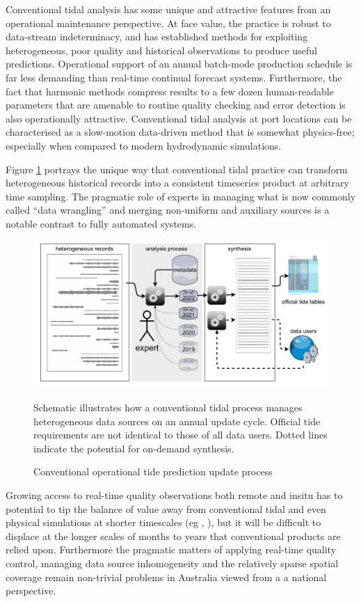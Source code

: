 Conventional tidal analysis has some unique and attractive features from an operational maintenance perspective.
At face value, the practice is robust to data-stream indeterminacy,  and has established methods for exploiting heterogeneous, poor quality and historical observations to produce useful predictions.  
Operational support of an annual batch-mode production schedule is far less demanding than real-time continual forecast systems. 
Furthermore, the fact that harmonic methods compress results to a few dozen human-readable parameters that are amenable to routine quality checking and error detection is also operationally attractive. 
Conventional tidal analysis at port locations can be characterised as a slow-motion data-driven method that is somewhat physics-free; especially when compared to modern hydrodynamic simulations. 

Figure \ref{fig:tidePractice} portrays the unique way that conventional tidal practice can transform heterogeneous historical records into a consistent timeseries product at arbitrary time sampling.
The pragmatic role of experts in managing what is now commonly  called ``data wrangling'' and merging non-uniform and auxiliary sources is a notable contrast to fully automated systems.
 
\begin{figure}[!hbt] \centering
        \includegraphics[width=\figwidthFull]{figures/diagrams/tideSchematic.pdf} 
        \caption{Conventional operational tide prediction update process}
        {Schematic illustrates how a conventional tidal process manages heterogeneous data sources on an annual update cycle.  Official tide requirements are not identical to those of all data users.  Dotted lines indicate the potential for on-demand synthesis.}
        \label{fig:tidePractice}
\end{figure}   


Growing access to real-time quality observations both remote and insitu has to potential to tip the balance of value away from conventional tidal and even physical simulations at shorter timescales (eg \citep{10.3389/fmars.2019.00437}, \citep{10.3389/fmars.2020.00260} ), but it will be difficult to displace at the longer scales of months to years that conventional products are relied upon.
Furthermore the pragmatic matters of applying real-time quality control, managing data source inhomogeneity and the relatively sparse spatial coverage remain non-trivial problems in Australia viewed from a a national perspective.


